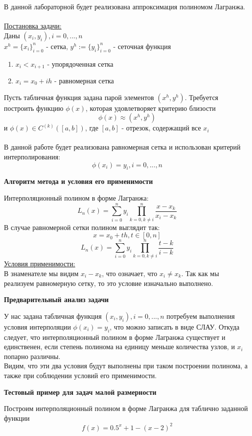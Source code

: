 \documentclass{article}
\begin{document}
	В данной лабораторной будет реализована аппроксимация полиномом Лагранжа.\\
	\\
	\underline{Постановка задачи:}\\
	Даны $(x_i,y_i),i=0,...,n$\\
	$x^h=\{x_i\}^n_{i=0}­$ - сетка, $y^h:=\{y_i\}^n_{i=0}­$ - сеточная функция
	\begin{enumerate}
		\item $x_i < x_{i+1}$ - упорядоченная сетка
		\item $x_i = x_0 + ih$ - равномерная сетка
	\end{enumerate}
	Пусть табличная функция задана парой элементов $(x^h,y^h)$. Требуется построить функцию $\phi(x)$, которая удовлетворяет критерию близости $$\phi(x) \approx (x^h,y^h)$$
	и $\phi(x) \in C^{(k)}([a,b])$, где $[a, b]$ - отрезок, содержащий все $x_i$\\
	\\
	В данной работе будет реализована равномерная сетка и использован критерий интерполирования: $$\phi(x_i) =y_i,i=0,...,n$$
	\begin{center} \textbf{Алгоритм метода и условия его применимости}\end{center}
	Интерполяционный полином в форме Лагранжа: $$L_n(x) = \sum_{i=0}^{n}y_i\prod_{k=0,k\neq i}^{n}\frac{x - x_k}{x_i - x_k}$$
	В случае равномерной сетки полином выглядит так: $$x = x_0 + th, t \in [0, n]$$ $$L_n(x) = \sum_{i=0}^{n}y_i\prod_{k=0,k\neq i}^{n}\frac{t - k}{i - k}$$
	\underline{Условия применимости:}\\
	В знаменателе мы видим $x_i - x_k$, что означает, что $x_i \neq x_k$. Так как мы реализуем равномерную сетку, то это условие изначально выполнено.
	\begin{center} \textbf{Предварительный анализ задачи}\end{center}
	У нас задана табличная функция $(x_i, y_i), i=0,...,n$ потребуем выполнения
	условия интерполяции $\phi(x_i) = y_i$, что можно записать в виде СЛАУ. Откуда следует, что интерполяционный полином в форме Лагранжа существует и единственен, если степень полинома на единицу меньше количества узлов, и $x_i$ попарно различны.\\
	Видим, что эти два условия будут выполнены при таком построении полинома, а
	также при соблюдении условий его применимости.
	\newpage
	\begin{center} \textbf{Тестовый пример для задач малой размерности}\end{center}
	Построим интерполяционный полином в форме Лагранжа для таблично заданной функции $$f(x) = 0.5^x + 1 - (x - 2)^2$$
\end{document}

